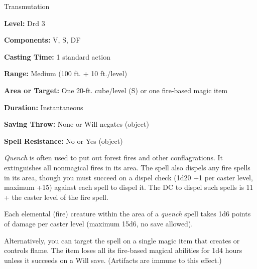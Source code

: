 
Transmutation

\textbf{Level:} Drd 3

\textbf{Components:} V, S, DF

\textbf{Casting Time:} 1 standard action

\textbf{Range:} Medium (100 ft. + 10 ft./level)

\textbf{Area or Target:} One 20-ft. cube/level (S) or one fire-based magic item

\textbf{Duration:} Instantaneous

\textbf{Saving Throw:} None or Will negates (object)

\textbf{Spell Resistance:} No or Yes (object)

\textit{Quench} is often used to put out forest fires and other conflagrations. 
It extinguishes all nonmagical fires in its area. The spell also dispels any fire 
spells in its area, though you must succeed on a dispel check (1d20 +1 per caster 
level, maximum +15) against each spell to dispel it. The DC to dispel such spells 
is 11 + the caster level of the fire spell.

Each elemental (fire) creature within the area of a \textit{quench} spell takes 
1d6 points of damage per caster level (maximum 15d6, no save allowed).

Alternatively, you can target the spell on a single magic item that creates or 
controls flame. The item loses all its fire-based magical abilities for 
1d4 hours unless it succeeds on a Will save. (Artifacts are immune to this effect.)

